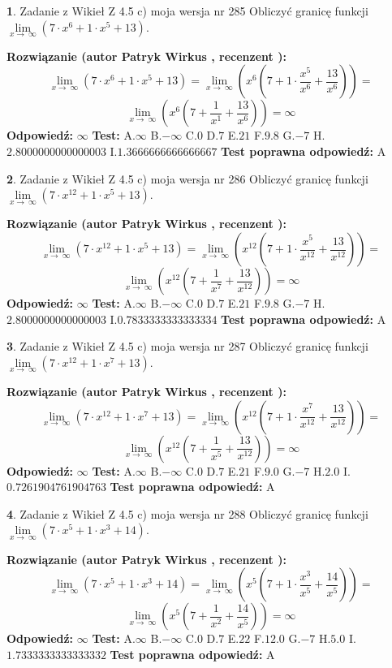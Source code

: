\documentclass[12pt, a4paper]{article}
\theoremstyle{definition} %
\newtheorem{zad}{}
\newcommand{\zadStart}[1]{\begin{zad}#1\newline}
\newcommand{\zadStop}{\end{zad}}
\newcommand{\rozwStart}[2]{\noindent \textbf{Rozwiązanie (autor #1 , recenzent #2): }\newline}
\newcommand{\rozwStop}{\newline}
\newcommand{\odpStart}{\noindent \textbf{Odpowiedź:}\newline}
\newcommand{\odpStop}{\newline}
\newcommand{\testStart}{\noindent \textbf{Test:}\newline}
\newcommand{\testStop}{\newline}
\newcommand{\kluczStart}{\noindent \textbf{Test poprawna odpowiedź:}\newline}
\newcommand{\kluczStop}{\newline}
\begin{document}
\zadStart{Zadanie z Wikieł Z 4.5 c) moja wersja nr 285}
Obliczyć granicę funkcji  $\lim\limits_{x\to\ \infty}(7 \cdot x^{6}+1 \cdot x^{5}+13)$.
\zadStop
\rozwStart{Patryk Wirkus}{}
$$\lim\limits_{x\to\ \infty}(7 \cdot x^{6}+1 \cdot x^{5}+13) = \lim\limits_{x\to\ \infty}(x^{6}(7 +1 \cdot \frac{x^{5}}{x^{6}}+\frac{13}{x^{6}})) =$$ $$\lim\limits_{x\to\ \infty}(x^{6}(7 +\frac{1}{x^{1}}+\frac{13}{x^{6}})) =\infty$$
\rozwStop
\odpStart
$\infty$
\odpStop
\testStart
A.$\infty$ B.$-\infty$ C.$0$ D.$7$ E.$21$
F.$9.8$ G.$-7$
H.$2.8000000000000003$
I.$1.3666666666666667$
\testStop
\kluczStart
A
\kluczStop



\zadStart{Zadanie z Wikieł Z 4.5 c) moja wersja nr 286}
Obliczyć granicę funkcji  $\lim\limits_{x\to\ \infty}(7 \cdot x^{12}+1 \cdot x^{5}+13)$.
\zadStop
\rozwStart{Patryk Wirkus}{}
$$\lim\limits_{x\to\ \infty}(7 \cdot x^{12}+1 \cdot x^{5}+13) = \lim\limits_{x\to\ \infty}(x^{12}(7 +1 \cdot \frac{x^{5}}{x^{12}}+\frac{13}{x^{12}})) =$$ $$\lim\limits_{x\to\ \infty}(x^{12}(7 +\frac{1}{x^{7}}+\frac{13}{x^{12}})) =\infty$$
\rozwStop
\odpStart
$\infty$
\odpStop
\testStart
A.$\infty$ B.$-\infty$ C.$0$ D.$7$ E.$21$
F.$9.8$ G.$-7$
H.$2.8000000000000003$
I.$0.7833333333333334$
\testStop
\kluczStart
A
\kluczStop



\zadStart{Zadanie z Wikieł Z 4.5 c) moja wersja nr 287}
Obliczyć granicę funkcji  $\lim\limits_{x\to\ \infty}(7 \cdot x^{12}+1 \cdot x^{7}+13)$.
\zadStop
\rozwStart{Patryk Wirkus}{}
$$\lim\limits_{x\to\ \infty}(7 \cdot x^{12}+1 \cdot x^{7}+13) = \lim\limits_{x\to\ \infty}(x^{12}(7 +1 \cdot \frac{x^{7}}{x^{12}}+\frac{13}{x^{12}})) =$$ $$\lim\limits_{x\to\ \infty}(x^{12}(7 +\frac{1}{x^{5}}+\frac{13}{x^{12}})) =\infty$$
\rozwStop
\odpStart
$\infty$
\odpStop
\testStart
A.$\infty$ B.$-\infty$ C.$0$ D.$7$ E.$21$
F.$9.0$ G.$-7$
H.$2.0$
I.$0.7261904761904763$
\testStop
\kluczStart
A
\kluczStop



\zadStart{Zadanie z Wikieł Z 4.5 c) moja wersja nr 288}
Obliczyć granicę funkcji  $\lim\limits_{x\to\ \infty}(7 \cdot x^{5}+1 \cdot x^{3}+14)$.
\zadStop
\rozwStart{Patryk Wirkus}{}
$$\lim\limits_{x\to\ \infty}(7 \cdot x^{5}+1 \cdot x^{3}+14) = \lim\limits_{x\to\ \infty}(x^{5}(7 +1 \cdot \frac{x^{3}}{x^{5}}+\frac{14}{x^{5}})) =$$ $$\lim\limits_{x\to\ \infty}(x^{5}(7 +\frac{1}{x^{2}}+\frac{14}{x^{5}})) =\infty$$
\rozwStop
\odpStart
$\infty$
\odpStop
\testStart
A.$\infty$ B.$-\infty$ C.$0$ D.$7$ E.$22$
F.$12.0$ G.$-7$
H.$5.0$
I.$1.7333333333333332$
\testStop
\kluczStart
A
\kluczStop
\end{document}
